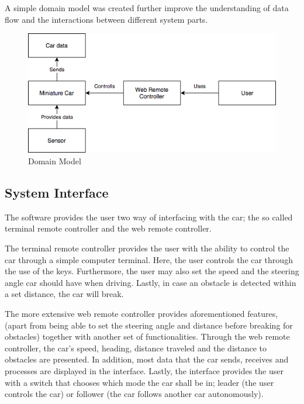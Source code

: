 \documentclass[12pt]{article}
\begin{document}
A simple domain model was created further improve the understanding of data flow and the interactions between different system parts. 
\FloatBarrier %
\begin{figure}[ht!]
\centering
\includegraphics[width=\linewidth]{Diagrams/DomainModel.png}
\caption{Domain Model}
\label{fig:domainmodel}
\end{figure}
\FloatBarrier %

\subsection{System Interface}
The software provides the user two way of interfacing with the car; the so called terminal remote controller and the web remote controller. 

The terminal remote controller provides the user with the ability to control the car through a simple computer terminal. Here, the user controls the car through the use of the keys. Furthermore, the user may also set the speed and the steering angle car should have when driving. Lastly, in case an obstacle is detected within a set distance, the car will break.

The more extensive web remote controller provides aforementioned features, (apart from being able to set the steering angle and distance before breaking for obstacles) together with another set of functionalities. Through the web remote controller, the car's speed, heading, distance traveled and the distance to obstacles are presented. In addition, most data that the car sends, receives and processes are displayed in the interface. Lastly, the interface provides the user with a switch that chooses which mode the car shall be in; leader (the user controls the car) or follower (the car follows another car autonomously).
\end{document}
